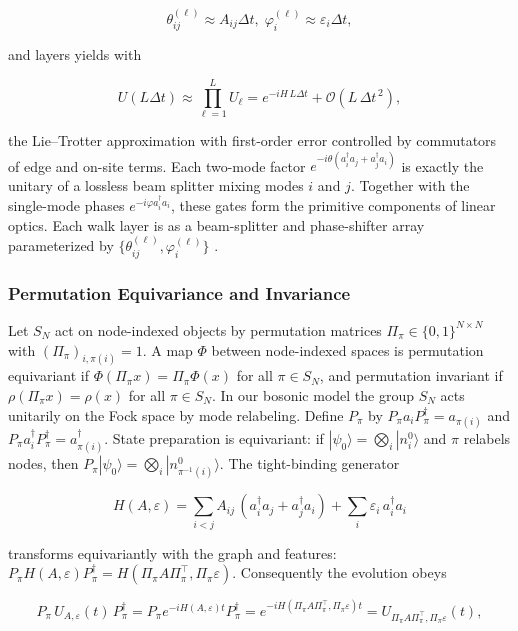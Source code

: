 \documentclass[11pt]{article}
\begin{document}
$$
\theta_{ij}^{(\ell)}\approx A_{ij}\Delta t,\; \varphi_i^{(\ell)}\approx \varepsilon_i\Delta t,
$$

and layers yields with 

$$
U(L\Delta t)\approx\prod_{\ell=1}^{L} U_\ell = e^{-iH\,L\Delta t} + \mathcal{O}(L\,\Delta t^{\,2}),
$$

the Lie--Trotter approximation with first-order error controlled by commutators of edge and on-site terms. Each two-mode factor $e^{-i\theta(a_i^\dagger a_j+a_j^\dagger a_i)}$ is exactly the unitary of a lossless beam splitter mixing modes $i$ and $j$. Together with the single-mode phases $e^{-i\varphi a_i^\dagger a_i}$, these gates form the primitive components of linear optics. Each walk layer is as a beam-splitter and phase-shifter array parameterized by $\{\theta_{ij}^{(\ell)},\varphi_i^{(\ell)}\}$ \citep{campos1989beamsplitter,reck1994universal,clements2016optical}.

\subsubsection{Permutation Equivariance and Invariance}

Let $S_N$ act on node-indexed objects by permutation matrices $\Pi_\pi\in\{0,1\}^{N\times N}$ with $(\Pi_\pi)_{i,\pi(i)}=1$. A map $\Phi$ between node-indexed spaces is permutation equivariant if $\Phi(\Pi_\pi x)=\Pi_\pi \Phi(x)$ for all $\pi\in S_N$, and permutation invariant if $\rho(\Pi_\pi x)=\rho(x)$ for all $\pi\in S_N$. In our bosonic model the group $S_N$ acts unitarily on the Fock space by mode relabeling. Define $P_\pi$ by $P_\pi a_i P_\pi^\dagger=a_{\pi(i)}$ and $P_\pi a_i^\dagger P_\pi^\dagger=a_{\pi(i)}^\dagger$. State preparation is equivariant: if $|\psi_0\rangle=\bigotimes_{i}|n_i^0\rangle$ and $\pi$ relabels nodes, then $P_\pi|\psi_0\rangle=\bigotimes_{i}|n_{\pi^{-1}(i)}^0\rangle$. The tight-binding generator

$$
H(A,\varepsilon)=\sum_{i<j}A_{ij}\,(a_i^\dagger a_j+a_j^\dagger a_i)+\sum_i \varepsilon_i\,a_i^\dagger a_i
$$

transforms equivariantly with the graph and features: $P_\pi H(A,\varepsilon) P_\pi^\dagger=H(\Pi_\pi A \Pi_\pi^\top,\Pi_\pi \varepsilon)$. Consequently the evolution obeys

$$
P_\pi\,U_{A,\varepsilon}(t)\,P_\pi^\dagger
= P_\pi e^{-iH(A,\varepsilon)t} P_\pi^\dagger
= e^{-iH(\Pi_\pi A \Pi_\pi^\top,\Pi_\pi \varepsilon)t}
= U_{\Pi_\pi A \Pi_\pi^\top,\Pi_\pi \varepsilon}(t),
$$
\end{document}
